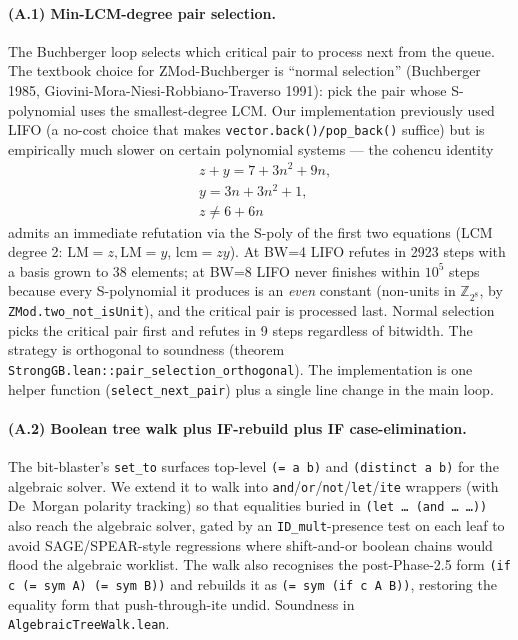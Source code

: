 \documentclass[runningheads]{llncs}
\begin{document}
\paragraph{(A.1) Min-LCM-degree pair selection.}
The Buchberger loop selects which critical pair to process next
from the queue. The textbook choice for ZMod-Buchberger is
``normal selection'' (Buchberger 1985,
Giovini-Mora-Niesi-Robbiano-Traverso 1991): pick the pair whose
S-polynomial uses the smallest-degree LCM. Our implementation
previously used LIFO (a no-cost choice that makes
\texttt{vector.back()/pop\_back()} suffice) but is empirically
much slower on certain polynomial systems --- the cohencu
identity
\begin{align*}
& z + y = 7 + 3n^2 + 9n,\\
& y = 3n + 3n^2 + 1,\\
& z \neq 6 + 6n
\end{align*}
admits an immediate refutation via the S-poly of the first two
equations (LCM degree 2: $\mathrm{LM} = z, \mathrm{LM} = y$,
$\mathrm{lcm} = zy$). At BW=4 LIFO refutes in 2923 steps with a
basis grown to 38 elements; at BW=8 LIFO never finishes within
$10^5$ steps because every S-polynomial it produces is an
\emph{even} constant (non-units in $\mathbb{Z}_{2^8}$, by
\texttt{ZMod.two\_not\_isUnit}), and the critical pair is
processed last. Normal selection picks the critical pair first
and refutes in 9 steps regardless of bitwidth. The strategy is
orthogonal to soundness (theorem
\texttt{StrongGB.lean::pair\_selection\_orthogonal}). The
implementation is one helper function (\texttt{select\_next\_pair})
plus a single line change in the main loop.

\paragraph{(A.2) Boolean tree walk plus IF-rebuild plus
IF case-elimination.}
The bit-blaster's \texttt{set\_to} surfaces top-level
\texttt{(= a b)} and \texttt{(distinct a b)} for the
algebraic solver. We extend it to walk into
\texttt{and}/\texttt{or}/\texttt{not}/\texttt{let}/\texttt{ite}
wrappers (with De~Morgan polarity tracking) so that equalities
buried in
\texttt{(let \ldots\ (and \ldots\ \ldots))} also reach the
algebraic solver, gated by an \texttt{ID\_mult}-presence test
on each leaf to avoid SAGE/SPEAR-style regressions where
shift-and-or boolean chains would flood the algebraic worklist.
The walk also recognises the post-Phase-2.5 form
\texttt{(if c (= sym A) (= sym B))} and rebuilds it as
\texttt{(= sym (if c A B))}, restoring the equality form that
push-through-ite undid. Soundness in
\texttt{AlgebraicTreeWalk.lean}.
\end{document}
